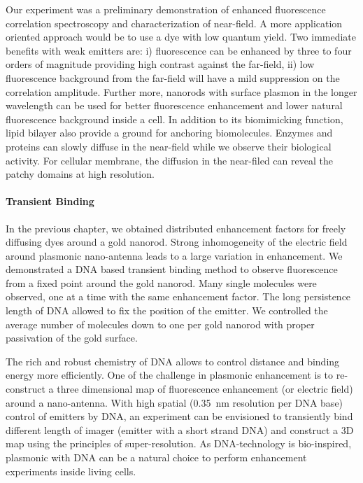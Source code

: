 Our experiment was a preliminary demonstration of enhanced fluorescence correlation spectroscopy and characterization of near-field. A more application oriented approach would be to use a dye with low quantum yield. Two immediate benefits with weak emitters are: i) fluorescence can be enhanced by three to four orders of magnitude providing high contrast against the far-field, ii) low fluorescence background from the far-field will have a mild suppression on the correlation amplitude. Further more, nanorods with surface plasmon in the longer wavelength can be used for better fluorescence enhancement and lower natural fluorescence background inside a cell. In addition to its biomimicking function, lipid bilayer also provide a ground for anchoring biomolecules. Enzymes and proteins can slowly diffuse in the near-field while we observe their biological activity. For cellular membrane, the diffusion in the near-filed can reveal the patchy domains at high resolution.

\paragraph*{Transient Binding}
In the previous chapter, we obtained distributed enhancement factors for freely diffusing dyes around a gold nanorod. Strong inhomogeneity of the electric field around plasmonic nano-antenna leads to a large variation in enhancement. We demonstrated a DNA based transient binding method to observe fluorescence from a fixed point around the gold nanorod. Many single molecules were observed, one at a time with the same enhancement factor. The long persistence length of DNA allowed to fix the position of the emitter. We controlled the average number of molecules down to one per gold nanorod with proper passivation of the gold surface.

The rich and robust chemistry of DNA allows to control distance and binding energy more efficiently. One of the challenge in plasmonic enhancement is to re-construct a three dimensional map of fluorescence enhancement (or electric field) around a nano-antenna. With high spatial (0.35~nm resolution per DNA base) control of emitters by DNA, an experiment can be envisioned to transiently bind different length of imager (emitter with a short strand DNA) and construct a 3D map using the principles of super-resolution. As DNA-technology is bio-inspired, plasmonic with DNA can be a natural choice to perform enhancement experiments inside living cells.

